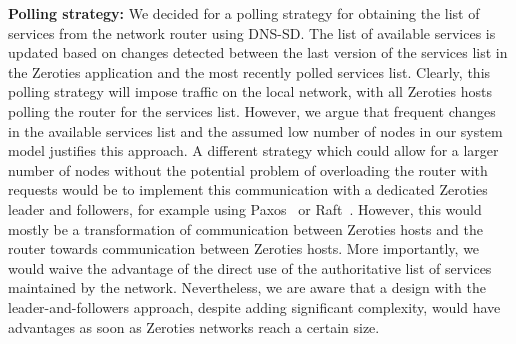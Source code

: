 \textbf{Polling strategy:}
We decided for a polling strategy for obtaining the list of services from the network router using DNS-SD.
The list of available services is updated based on changes detected between the last version of the services list in the Zeroties application and the most recently polled services list.
Clearly, this polling strategy will impose traffic on the local network, with all Zeroties hosts polling the router for the services list.
However, we argue that frequent changes in the available services list and the assumed low number of nodes in our system model justifies this approach.
A different strategy which could allow for a larger number of nodes without the potential problem of overloading the router with requests would be to implement this communication with a dedicated Zeroties leader and followers, for example using Paxos~\cite{lamport_2001} or Raft~\cite{ongaro_2014}.
However, this would mostly be a transformation of communication between Zeroties hosts and the router towards communication between Zeroties hosts. 
More importantly, we would waive the advantage of the direct use of the authoritative list of services maintained by the network.
Nevertheless, we are aware that a design with the leader-and-followers approach, despite adding significant complexity, would have advantages as soon as Zeroties networks reach a certain size.



